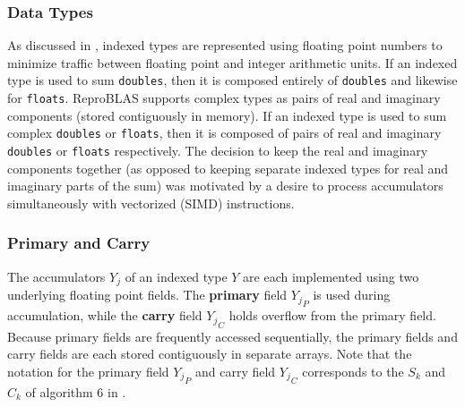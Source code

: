 \documentclass[12pt]{article}
\theoremstyle{plain}
\begin{document}
    \subsubsection{Data Types}
      As discussed in \cite{repsum}, indexed types are represented using floating point numbers to minimize traffic between floating point and integer arithmetic units. If an indexed type is used to sum \verb|doubles|, then it is composed entirely of \verb|doubles| and likewise for \verb|floats|. ReproBLAS supports complex types as pairs of real and imaginary components (stored contiguously in memory). If an indexed type is used to sum complex \verb|doubles| or \verb|floats|, then it is composed of pairs of real and imaginary \verb|doubles| or \verb|floats| respectively. The decision to keep the real and imaginary components together (as opposed to keeping separate indexed types for real and imaginary parts of the sum) was motivated by a desire to process accumulators simultaneously with vectorized (SIMD) instructions.

    \subsubsection{Primary and Carry}
      The accumulators $Y_j$ of an indexed type $Y$ are each implemented using two underlying floating point fields. The \textbf{primary} field ${Y_j}_P$ is used during accumulation, while the \textbf{carry} field ${Y_j}_C$ holds overflow from the primary field. Because primary fields are frequently accessed sequentially, the primary fields and carry fields are each stored contiguously in separate arrays. Note that the notation for the primary field ${Y_j}_P$ and carry field ${Y_j}_C$ corresponds to the $S_k$ and $C_k$ of algorithm $6$ in \cite{repsum}.
\end{document}
